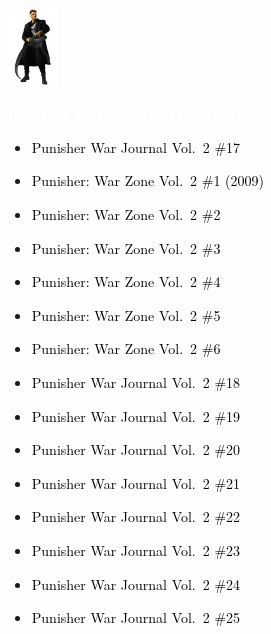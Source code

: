 \documentclass[12pt]{article}
\newcommand{\checkbox}{\raisebox{0.0ex}{\fbox{\rule{0ex}{1.5ex} \rule{1.5ex}{0ex}}}}
\begin{document}
\begin{center}
    \vspace*{2cm}
    \includegraphics[width=0.1\textwidth]{PUNISHER1.PNG}
    \vspace{0.3cm}

    {\Huge \textbf{\textcolor{white}{Punisher Chronological Checklist}}}
\end{center}

\vspace{0.3cm}
\noindent
\begin{tcolorbox}[
  colback=white!95!gray,
  colframe=black,
  width=\textwidth,
  arc=4mm,
  auto outer arc,
  boxrule=0.8pt,
  left=8pt,right=8pt,top=8pt,bottom=8pt
]
\begin{itemize}[left=0pt,label={\checkbox}]
    \item \textcolor{black}{Punisher War Journal Vol.\ 2 \#17}
    \item \textcolor{black}{Punisher: War Zone Vol.\ 2 \#1 (2009)}
    \item \textcolor{black}{Punisher: War Zone Vol.\ 2 \#2}
    \item \textcolor{black}{Punisher: War Zone Vol.\ 2 \#3}
    \item \textcolor{black}{Punisher: War Zone Vol.\ 2 \#4}
    \item \textcolor{black}{Punisher: War Zone Vol.\ 2 \#5}
    \item \textcolor{black}{Punisher: War Zone Vol.\ 2 \#6}
    \item \textcolor{black}{Punisher War Journal Vol.\ 2 \#18}
    \item \textcolor{black}{Punisher War Journal Vol.\ 2 \#19}
    \item \textcolor{black}{Punisher War Journal Vol.\ 2 \#20}
    \item \textcolor{black}{Punisher War Journal Vol.\ 2 \#21}
    \item \textcolor{black}{Punisher War Journal Vol.\ 2 \#22}
    \item \textcolor{black}{Punisher War Journal Vol.\ 2 \#23}
    \item \textcolor{black}{Punisher War Journal Vol.\ 2 \#24}
    \item \textcolor{black}{Punisher War Journal Vol.\ 2 \#25}
\end{itemize}
\end{tcolorbox}
\end{document}

